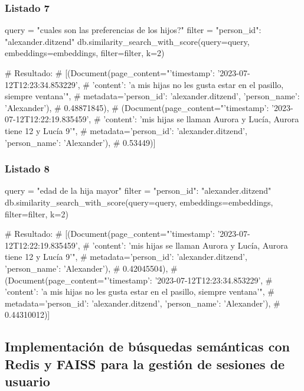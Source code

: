 \subsubsection{Listado 7}
\label{anexo:code-4-1-3-7}

\begin{APACode}
query = "cuales son las preferencias de los hijos?" 
filter = {"person_id": "alexander.ditzend"}
db.similarity_search_with_score(query=query, embeddings=embeddings, 
                                filter=filter, k=2)

# Resultado:
# [(Document(page_content="{'timestamp': '2023-07-12T12:23:34.853229', 
#    'content': 'a mis hijas no les gusta estar en el pasillo, siempre ventana'}", 
#    metadata={'person_id': 'alexander.ditzend', 'person_name': 'Alexander'}),
#   0.48871845),
#  (Document(page_content="{'timestamp': '2023-07-12T12:22:19.835459', 
#    'content': 'mis hijas se llaman Aurora y Lucía, Aurora tiene 12 y Lucía 9'}", 
#    metadata={'person_id': 'alexander.ditzend', 'person_name': 'Alexander'}),
#   0.53449)]
\end{APACode}

\subsubsection{Listado 8}
\label{anexo:code-4-1-3-8}

\begin{APACode}
query = "edad de la hija mayor"
filter = {"person_id": "alexander.ditzend"} 
db.similarity_search_with_score(query=query, embeddings=embeddings, 
                                filter=filter, k=2)

# Resultado:
# [(Document(page_content="{'timestamp': '2023-07-12T12:22:19.835459', 
#    'content': 'mis hijas se llaman Aurora y Lucía, Aurora tiene 12 y Lucía 9'}", 
#    metadata={'person_id': 'alexander.ditzend', 'person_name': 'Alexander'}),
#   0.42045504),
#  (Document(page_content="{'timestamp': '2023-07-12T12:23:34.853229', 
#    'content': 'a mis hijas no les gusta estar en el pasillo, siempre ventana'}", 
#    metadata={'person_id': 'alexander.ditzend', 'person_name': 'Alexander'}),
#   0.44310012)]
\end{APACode}

\subsection{Implementación de búsquedas semánticas con Redis y FAISS para la gestión de sesiones de usuario}

